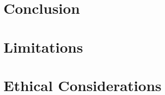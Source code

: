 \documentclass[11pt]{article}
\begin{document}
\section{Conclusion}
\label{sec:conclusion}

\section*{Limitations}

\section*{Ethical Considerations}


\appendix
\end{document}
